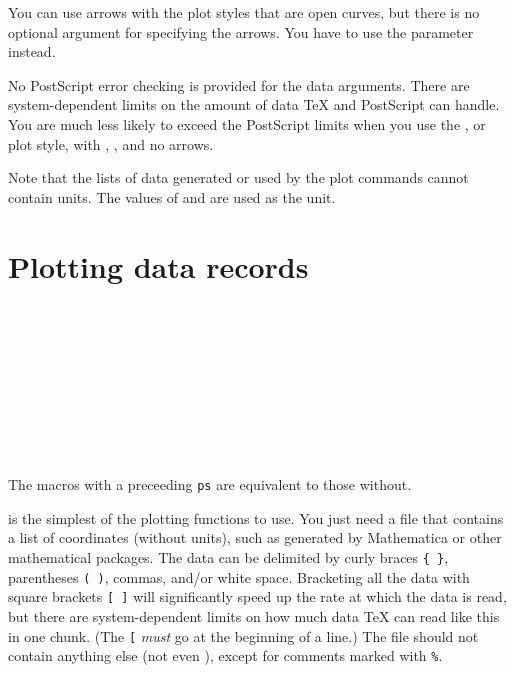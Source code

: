 \documentclass[11pt,english,BCOR=10mm,DIV=12,bibliography=totoc,parskip=false,headings=small,
    headinclude=false,footinclude=false,twoside]{pst-doc}
\begin{document}
You can use arrows with the plot styles that are open curves, but there is no
optional argument for specifying the arrows. You have to use the 
parameter instead.

No\XInfoDanger{~} PostScript error checking is provided for the data arguments. %
There are system-dependent limits on the amount of data \TeX{} and PostScript
can handle. You are much less likely to exceed the PostScript limits when you
use the ,  or  plot style, with ,
, and no arrows.

Note that the lists of data generated or used by the plot commands cannot
contain units. The values of  and  are used as the unit.


\section{Plotting data records}

\begin{BDef}
 \OptArgs{}\\
 \OptArgs{}\\
 \OptArgs{}\\
 \OptArgs{}\\
 \\
 \\
 \OptArgs{}\\
 \\
\end{BDef}
The macros with a preceeding \verb|ps| are equivalent to those without.

 is the simplest of the plotting functions to use. You just need a
file that contains a list of coordinates (without units), such as generated by
Mathematica or other mathematical packages. The data can be delimited by curly
braces \verb|{ }|, parentheses \verb|( )|, commas, and/or white space. Bracketing
all the data with square brackets \verb|[ ]| will significantly speed up the rate
at which the data is read, but there are system-dependent limits on how much
data \TeX{} can read like this in one chunk. (The \verb|[| \emph{must} go at the
beginning of a line.) The file should not contain anything else (not even
), except for comments marked with \verb|%|.
\end{document}
